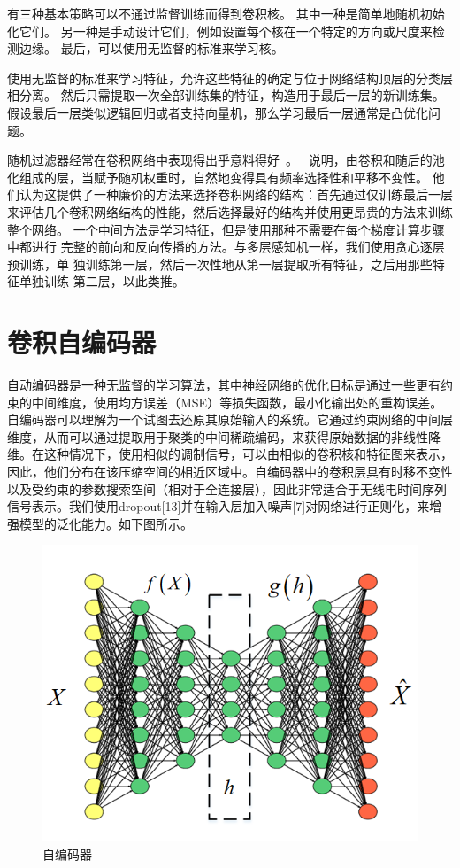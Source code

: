 有三种基本策略可以不通过监督训练而得到卷积核。
其中一种是简单地随机初始化它们。
另一种是手动设计它们，例如设置每个核在一个特定的方向或尺度来检测边缘。
最后，可以使用无监督的标准来学习核。\par

使用无监督的标准来学习特征，允许这些特征的确定与位于网络结构顶层的分类层相分离。
然后只需提取一次全部训练集的特征，构造用于最后一层的新训练集。
假设最后一层类似逻辑回归或者支持向量机，那么学习最后一层通常是凸优化问题。\par


随机过滤器经常在卷积网络中表现得出乎意料得好~\cite{Jarrett-ICCV2009-small,Saxe-ICML2011,pinto2011scaling,cox2011beyond}。
\cite{Saxe-ICML2011}~说明，由卷积和随后的池化组成的层，当赋予随机权重时，自然地变得具有频率选择性和平移不变性。
他们认为这提供了一种廉价的方法来选择卷积网络的结构：首先通过仅训练最后一层来评估几个卷积网络结构的性能，然后选择最好的结构并使用更昂贵的方法来训练整个网络。
一个中间方法是学习特征，但是使用那种不需要在每个梯度计算步骤中都进行
完整的前向和反向传播的方法。与多层感知机一样，我们使用贪心逐层预训练，单
独训练第一层，然后一次性地从第一层提取所有特征，之后用那些特征单独训练
第二层，以此类推。



\section{卷积自编码器}

自动编码器是一种无监督的学习算法，其中神经网络的优化目标是通过一些更有约束的中间维度，使用均方误差（MSE）等损失函数，最小化输出处的重构误差。
自编码器可以理解为一个试图去还原其原始输入的系统。它通过约束网络的中间层维度，从而可以通过提取用于聚类的中间稀疏编码，来获得原始数据的非线性降维。在这种情况下，使用相似的调制信号，可以由相似的卷积核和特征图来表示，因此，他们分布在该压缩空间的相近区域中。自编码器中的卷积层具有时移不变性以及受约束的参数搜索空间（相对于全连接层），因此非常适合于无线电时间序列信号表示。我们使用dropout[13]并在输入层加入噪声[7]对网络进行正则化，来增强模型的泛化能力。如下图所示。
\begin{figure}[!h]
	\centering
	\includegraphics[scale=0.7]{figures/chapter_2/fig_2_5}
	\caption{自编码器}	\label{fig_2_5}
\end{figure}

